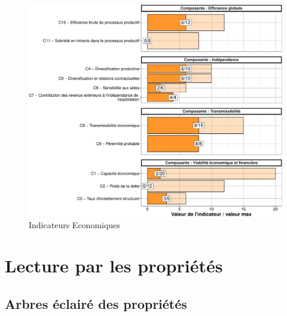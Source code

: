 \documentclass[]{article}
\begin{document}
\begin{figure}[H]
\includegraphics[width=1\linewidth]{report_files/figure-latex/unnamed-chunk-8-1} \caption{Indicateurs Economiques}\label{fig:unnamed-chunk-8}
\end{figure}

\hbox{}

\hypertarget{lecture-par-les-propriuxe9tuxe9s}{%
\section{Lecture par les
propriétés}\label{lecture-par-les-propriuxe9tuxe9s}}

\hypertarget{arbres-uxe9clairuxe9-des-propriuxe9tuxe9s}{%
\subsection{Arbres éclairé des
propriétés}\label{arbres-uxe9clairuxe9-des-propriuxe9tuxe9s}}

\end{document}
